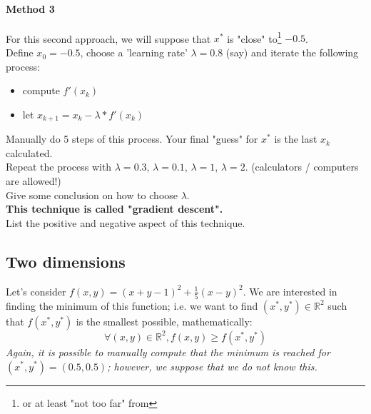 \documentclass[]{article}
\newcommand{\R}{\mathbb{R}}
\begin{document}
	\paragraph{Method 3}
	For this second approach, we will suppose that $x^*$ is "close" to\footnote{or at least "not too far" from} $-0.5$.\\
	Define $x_0=-0.5$, choose a 'learning rate' $\lambda=0.8$ (say) and iterate the following process:
	\begin{itemize}
		\item compute $f'(x_k)$
		\item let $x_{k+1} = x_k - \lambda * f'(x_k)$
	\end{itemize}
	Manually do 5 steps of this process.
	Your final "guess" for $x^*$ is the last $x_k$ calculated.\\
	Repeat the process with $\lambda=0.3$, $\lambda=0.1$, $\lambda=1$, $\lambda=2$. (calculators / computers are allowed!)\\
	Give some conclusion on how to choose $\lambda$.\\
	\textbf{This technique is called "gradient descent".}\\
	List the positive and negative aspect of this technique.
	
	\subsection{Two dimensions}
	Let's consider $f(x,y) = (x+y-1)^2 + \frac{1}{5}(x-y)^2$.
	We are interested in finding the minimum of this function; 
	i.e. we want to find $(x^*,y^*) \in \R^2$ such that $f(x^*,y^*)$ is the smallest possible, mathematically:
	$$\forall (x,y) \in \R^2, f(x,y) \geq f(x^*, y^*)$$
	\textit{Again, it is possible to manually compute that the minimum is reached for $(x^*, y^*) = (0.5, 0.5)$; however, we suppose that we do not know this.}
	
	
	
	
	
	
\end{document}
